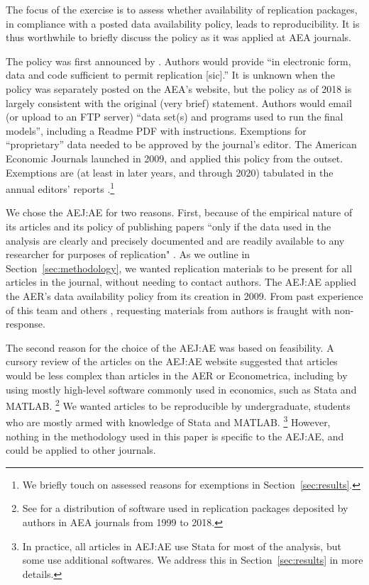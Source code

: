 % 
%
The focus of the exercise is to assess whether availability of replication packages, in compliance with a posted data availability policy, leads to reproducibility. It is thus worthwhile to briefly discuss the policy as it was applied at AEA journals. 

The policy was first announced by \citet{bernanke2004}. Authors would provide ``in electronic form, data and code sufficient to permit replication [sic].'' It is unknown when the policy was separately posted on the AEA's website, but the policy as of 2018  \citep{American_Economic_Association2008-wayback} is largely consistent with the original (very brief) statement. Authors would email (or upload to an FTP server) ``data set(s) and programs used to run the final models'', including a Readme PDF with instructions. Exemptions for ``proprietary'' data needed to be approved by the journal's editor. The American Economic Journals launched in 2009, and applied this policy from the outset. Exemptions are (at least in later years, and through 2020) tabulated in the annual editors' reports \citep[see f.i.][]{mas2019}.\footnote{We briefly touch on assessed reasons for exemptions in Section~\ref{sec:results}.} 

We chose the \ac{AEJ:AE}  for two reasons. First, because of the empirical nature of its articles and its policy of publishing papers ``only if the data used in the analysis are clearly and precisely documented and are readily available to any researcher for purposes of replication" \citep{American_Economic_Association2008-wayback}. As we outline in Section~\ref{sec:methodology}, we wanted replication materials to be present for all articles in the journal, without needing to contact authors. The \ac{AEJ:AE} applied the AER's data availability policy from its creation in 2009. From past experience of this team \citep{vilhuber2020a} and others \citep[e.g.][]{Dewald1986,McCullough03,Stodden2018}, requesting materials from authors is fraught with non-response. 

The second reason for the choice of the \ac{AEJ:AE} was based on feasibility. A cursory review of the articles on the \ac{AEJ:AE} website suggested that articles would be less complex than articles in the \ac{AER} or Econometrica, including by using mostly high-level software commonly used in economics, such as Stata and MATLAB.%
%
\footnote{See \citet{VilhuberAEAPap.Proc.2020} for a distribution of software used in replication packages deposited by authors in AEA journals from 1999 to 2018.}
We wanted articles to be reproducible by undergraduate, students who are mostly armed with knowledge of Stata and MATLAB.%
%
\footnote{In practice, all articles in \ac{AEJ:AE} use Stata for most of the analysis, but some use additional softwares. We address this in Section~\ref{sec:results} in more details.}
However, nothing in the methodology used in this paper is specific to the \ac{AEJ:AE}, and could be applied to other journals. 

